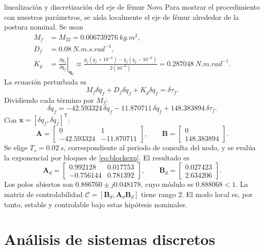 \documentclass[11pt,letterpaper]{article}
\newcommand{\vect}[1]{\bm{#1}}
\newcommand{\mat}[1]{\bm{#1}}
\newcommand{\trans}{^{\mathsf T}}
\begin{document}
\begin{workedexample}{linealización y discretización del eje de fémur Nova}
Para mostrar el procedimiento con nuestros parámetros, se aísla localmente el
eje de fémur alrededor de la postura nominal. Se usan
\begin{align*}
 M_f&=M_{22}=\SI{0.006739276}{kg.m^2},\\
 D_f&=\SI{0.08}{N.m.s.rad^{-1}},\\
 K_g&=\left.\frac{\partial g_f}{\partial q_f}\right|_{\vect q_0}
 \approx\frac{g_f(q_f+10^{-6})-g_f(q_f-10^{-6})}{2(10^{-6})}
 =\SI{0.287048}{N.m.rad^{-1}}.
\end{align*}
La ecuación perturbada es
\[
 M_f\delta\ddot q_f+D_f\delta\dot q_f+K_g\delta q_f=\delta\tau_f.
\]
Dividiendo cada término por $M_f$:
\[
 \delta\ddot q_f=-42.593324\,\delta q_f
 -11.870711\,\delta\dot q_f+148.383894\,\delta\tau_f.
\]
Con $\vect x=[\delta q_f,\delta\dot q_f]\trans$:
\[
 \mat A=\begin{bmatrix}0&1\\-42.593324&-11.870711\end{bmatrix},\qquad
 \mat B=\begin{bmatrix}0\\148.383894\end{bmatrix}.
\]
Se elige $T_s=\SI{0.02}{s}$, correspondiente al periodo de consulta del nodo,
y se evalúa la exponencial por bloques de \cref{eq:blockexp}. El resultado es
\[
 \boxed{\mat A_d=\begin{bmatrix}
0.992128&0.017753\\-0.756144&0.781392
\end{bmatrix}},\qquad
 \boxed{\mat B_d=\begin{bmatrix}0.027423\\2.634206\end{bmatrix}}.
\]
Los polos abiertos son $0.886760\pm j0.048178$, cuyo módulo es $0.888068<1$.
La matriz de controlabilidad
$\mathcal C=[\mat B_d,\mat A_d\mat B_d]$ tiene rango 2. El modo local es, por
tanto, estable y controlable bajo estas hipótesis nominales.
\end{workedexample}

\section{Análisis de sistemas discretos}
\end{document}
